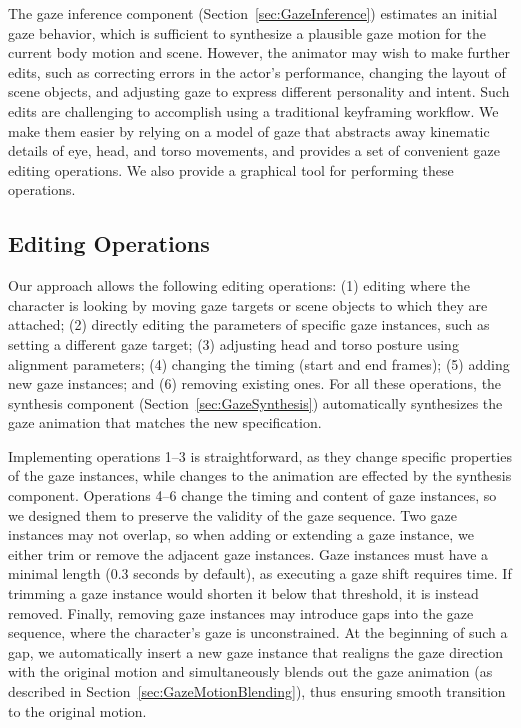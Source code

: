 The gaze inference component (Section~\ref{sec:GazeInference}) estimates an initial gaze behavior, which is sufficient to synthesize a plausible gaze motion for the current body motion and scene. However, the animator may wish to make further edits, such as correcting errors in the actor's performance, changing the layout of scene objects, and adjusting gaze to express different personality and intent. Such edits are challenging to accomplish using a traditional keyframing workflow. We make them easier by relying on a model of gaze that abstracts away kinematic details of eye, head, and torso movements, and provides a set of convenient gaze editing operations. We also provide a graphical tool for performing these operations.

\subsection{Editing Operations}

Our approach allows the following editing operations: (1) editing where the character is looking by moving gaze targets or scene objects to which they are attached; (2) directly editing the parameters of specific gaze instances, such as setting a different gaze target; (3) adjusting head and torso posture using alignment parameters; (4) changing the timing (start and end frames); (5) adding new gaze instances; and (6) removing existing ones. For all these operations, the synthesis component (Section~\ref{sec:GazeSynthesis}) automatically synthesizes the gaze animation that matches the new specification.

Implementing operations 1--3 is straightforward, as they change specific properties of the gaze instances, while changes to the animation are effected by the synthesis component. Operations 4--6 change the timing and content of gaze instances, so we designed them to preserve the validity of the gaze sequence. Two gaze instances may not overlap, so when adding or extending a gaze instance, we either trim or remove the adjacent gaze instances. Gaze instances must have a minimal length (0.3 seconds by default), as executing a gaze shift requires time. If trimming a gaze instance would shorten it below that threshold, it is instead removed. Finally, removing gaze instances may introduce gaps into the gaze sequence, where the character's gaze is unconstrained. At the beginning of such a gap, we automatically insert a new gaze instance that realigns the gaze direction with the original motion and simultaneously blends out the gaze animation (as described in Section~\ref{sec:GazeMotionBlending}), thus ensuring smooth transition to the original motion.


